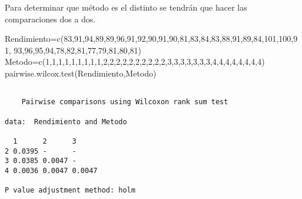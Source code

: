 \documentclass[
  a4paper,
  oneside,
  openany]{book}
\newenvironment{Shaded}{\begin{snugshade}}{\end{snugshade}}
\newcommand{\DecValTok}[1]{\textcolor[rgb]{0.00,0.00,0.81}{#1}}
\newcommand{\FunctionTok}[1]{\textcolor[rgb]{0.00,0.00,0.00}{#1}}
\newcommand{\NormalTok}[1]{#1}
\newcommand{\OtherTok}[1]{\textcolor[rgb]{0.56,0.35,0.01}{#1}}
\begin{document}
Para determinar que método es el distinto se tendrán que hacer las comparaciones dos a dos.

\begin{Shaded}
\begin{Highlighting}[]
\NormalTok{Rendimiento}\OtherTok{=}\FunctionTok{c}\NormalTok{(}\DecValTok{83}\NormalTok{,}\DecValTok{91}\NormalTok{,}\DecValTok{94}\NormalTok{,}\DecValTok{89}\NormalTok{,}\DecValTok{89}\NormalTok{,}\DecValTok{96}\NormalTok{,}\DecValTok{91}\NormalTok{,}\DecValTok{92}\NormalTok{,}\DecValTok{90}\NormalTok{,}\DecValTok{91}\NormalTok{,}\DecValTok{90}\NormalTok{,}\DecValTok{81}\NormalTok{,}\DecValTok{83}\NormalTok{,}\DecValTok{84}\NormalTok{,}\DecValTok{83}\NormalTok{,}\DecValTok{88}\NormalTok{,}\DecValTok{91}\NormalTok{,}\DecValTok{89}\NormalTok{,}\DecValTok{84}\NormalTok{,}\DecValTok{101}\NormalTok{,}\DecValTok{100}\NormalTok{,}\DecValTok{91}\NormalTok{,}
              \DecValTok{93}\NormalTok{,}\DecValTok{96}\NormalTok{,}\DecValTok{95}\NormalTok{,}\DecValTok{94}\NormalTok{,}\DecValTok{78}\NormalTok{,}\DecValTok{82}\NormalTok{,}\DecValTok{81}\NormalTok{,}\DecValTok{77}\NormalTok{,}\DecValTok{79}\NormalTok{,}\DecValTok{81}\NormalTok{,}\DecValTok{80}\NormalTok{,}\DecValTok{81}\NormalTok{)}
\NormalTok{Metodo}\OtherTok{=}\FunctionTok{c}\NormalTok{(}\DecValTok{1}\NormalTok{,}\DecValTok{1}\NormalTok{,}\DecValTok{1}\NormalTok{,}\DecValTok{1}\NormalTok{,}\DecValTok{1}\NormalTok{,}\DecValTok{1}\NormalTok{,}\DecValTok{1}\NormalTok{,}\DecValTok{1}\NormalTok{,}\DecValTok{1}\NormalTok{,}\DecValTok{2}\NormalTok{,}\DecValTok{2}\NormalTok{,}\DecValTok{2}\NormalTok{,}\DecValTok{2}\NormalTok{,}\DecValTok{2}\NormalTok{,}\DecValTok{2}\NormalTok{,}\DecValTok{2}\NormalTok{,}\DecValTok{2}\NormalTok{,}\DecValTok{2}\NormalTok{,}\DecValTok{2}\NormalTok{,}\DecValTok{3}\NormalTok{,}\DecValTok{3}\NormalTok{,}\DecValTok{3}\NormalTok{,}\DecValTok{3}\NormalTok{,}\DecValTok{3}\NormalTok{,}\DecValTok{3}\NormalTok{,}\DecValTok{3}\NormalTok{,}\DecValTok{4}\NormalTok{,}\DecValTok{4}\NormalTok{,}\DecValTok{4}\NormalTok{,}\DecValTok{4}\NormalTok{,}\DecValTok{4}\NormalTok{,}\DecValTok{4}\NormalTok{,}\DecValTok{4}\NormalTok{,}\DecValTok{4}\NormalTok{)}
\FunctionTok{pairwise.wilcox.test}\NormalTok{(Rendimiento,Metodo)}
\end{Highlighting}
\end{Shaded}

\begin{verbatim}

    Pairwise comparisons using Wilcoxon rank sum test 

data:  Rendimiento and Metodo 

  1      2      3     
2 0.0395 -      -     
3 0.0385 0.0047 -     
4 0.0036 0.0047 0.0047

P value adjustment method: holm 
\end{verbatim}
\end{document}
